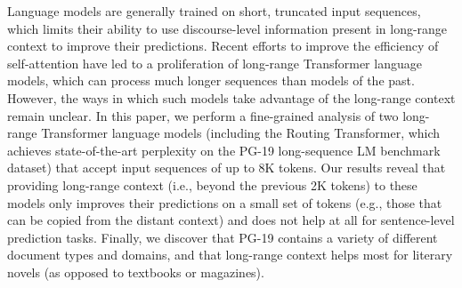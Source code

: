 Language models are generally trained on short, truncated input sequences, which limits their ability to use discourse-level information present in long-range context to improve their predictions. Recent efforts to improve the efficiency of self-attention have led to a proliferation of long-range Transformer language models, which can process much longer sequences than models of the past. However, the ways in which such models take advantage of the long-range context remain unclear. In this paper, we perform a fine-grained analysis of two long-range Transformer language models (including the Routing Transformer, which achieves state-of-the-art perplexity on the PG-19 long-sequence LM benchmark dataset) that accept input sequences of up to 8K tokens. Our results reveal that providing long-range context (i.e., beyond the previous 2K tokens) to these models only improves their predictions on a small set of tokens (e.g., those that can be copied from the distant context) and does not help at all for sentence-level prediction tasks. Finally, we discover that PG-19 contains a variety of different document types and domains, and that long-range context helps most for literary novels (as opposed to textbooks or magazines).
